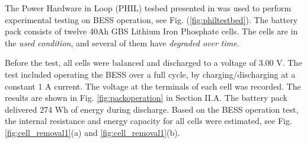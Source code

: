 \documentclass[10pt,twocolumn]{IEEEtran}
\begin{document}
The Power Hardware in Loop (PHIL) tesbed  presented in \cite{PHIL} was used to perform experimental testing on BESS operation, see Fig. (\ref{fig:philtestbed}). 
The battery pack consists of twelve  40Ah GBS Lithium Iron Phosphate cells. %
The cells are in the \emph{used condition}, and several of them have \emph{degraded over time}. 


Before the test, all cells were balanced and discharged to a voltage of 3.00 V. 
The test included operating the BESS over a full cycle, by charging/discharging at a constant 1 A current.  %
The voltage  at the terminals of each cell   was  recorded. %
The results are shown in Fig.  \ref{fig:packoperation}  in Section II.A.
The battery pack delivered 274 Wh of energy during discharge.
Based on the BESS operation test, the  internal resistance and energy capacity for all cells were  estimated, see  Fig. \ref{fig:cell_removal1}(a) and \ref{fig:cell_removal1}(b).






%
\end{document}
